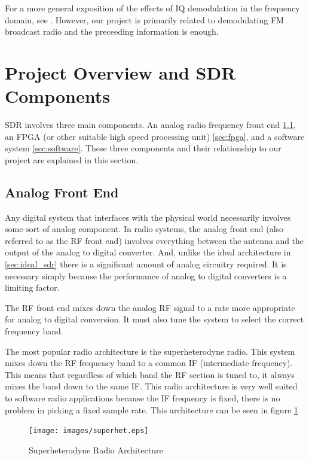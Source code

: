 \documentclass[a4paper, 12pt, notitlepage]{article}
\begin{document}
For a more general exposition of the effects of IQ demodulation in the frequency domain, see \cite{iq_sampling}.  However, our project is primarily related to demodulating FM broadcast radio and the preceeding information is enough.

\section{Project Overview and SDR Components}
SDR involves three main components.  An analog radio frequency front end \ref{sec:analog_frontend}, an FPGA (or other suitable high speed processing unit) \ref{sec:fpga}, and a software system \ref{sec:software}.  These three components and their relationship to our project are explained in this section.

\subsection{Analog Front End}
\label{sec:analog_frontend}
Any digital system that interfaces with the physical world necessarily involves some sort of analog component.  In radio systems, the analog front end (also referred to as the RF front end) involves everything between the antenna and the output of the analog to digital converter.  And, unlike the ideal architecture in \ref{sec:ideal_sdr} there is a significant amount of analog circuitry required.  It is necessary simply because the performance of analog to digital converters is a limiting factor.

The RF front end mixes down the analog RF signal to a rate more appropriate for analog to digital conversion.  It must also tune the system to select the correct frequency band.

The most popular radio architecture is the superheterodyne radio.  This system mixes down the RF frequency band to a common IF (intermediate frequency).  This means that regardless of which band the RF section is tuned to, it always mixes the band down to the same IF.  This radio architecture is very well suited to software radio applications because the IF frequency is fixed, there is no problem in picking a fixed sample rate.  This architecture can be seen in figure \ref{fig:superhet}

\begin{figure}
\centering
\caption{Superheterodyne Radio Architecture}
\label{fig:superhet}
\texttt{[image: images/superhet.eps]}
\end{figure}
\end{document}
